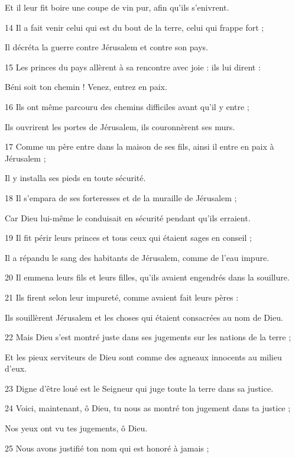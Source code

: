 \par     Et il leur fit boire une coupe de vin pur, afin qu'ils s'enivrent.
\par 14 Il a fait venir celui qui est du bout de la terre, celui qui frappe fort ;
\par     Il décréta la guerre contre Jérusalem et contre son pays.
\par 15 Les princes du pays allèrent à sa rencontre avec joie : ils lui dirent :
\par     Béni soit ton chemin ! Venez, entrez en paix.
\par 16 Ils ont même parcouru des chemins difficiles avant qu'il y entre ;
\par     Ils ouvrirent les portes de Jérusalem, ils couronnèrent ses murs.
\par   
\par 17 Comme un père entre dans la maison de ses fils, ainsi il entre en paix à Jérusalem ;
\par     Il y installa ses pieds en toute sécurité.
\par 18 Il s'empara de ses forteresses et de la muraille de Jérusalem ;
\par     Car Dieu lui-même le conduisait en sécurité pendant qu'ils erraient.
\par 19 Il fit périr leurs princes et tous ceux qui étaient sages en conseil ;
\par     Il a répandu le sang des habitants de Jérusalem, comme de l'eau impure.
\par 20 Il emmena leurs fils et leurs filles, qu'ils avaient engendrés dans la souillure.
\par   
\par 21 Ils firent selon leur impureté, comme avaient fait leurs pères :
\par     Ils souillèrent Jérusalem et les choses qui étaient consacrées au nom de Dieu.
\par 22 Mais Dieu s'est montré juste dans ses jugements sur les nations de la terre ;
\par     Et les pieux serviteurs de Dieu sont comme des agneaux innocents au milieu d’eux.
\par 23 Digne d'être loué est le Seigneur qui juge toute la terre dans sa justice.
\par   
\par 24 Voici, maintenant, ô Dieu, tu nous as montré ton jugement dans ta justice ;
\par     Nos yeux ont vu tes jugements, ô Dieu.
\par 25 Nous avons justifié ton nom qui est honoré à jamais ;
